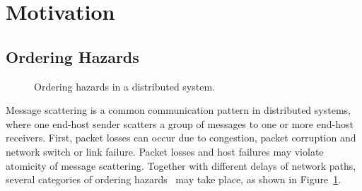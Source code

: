 \section{Motivation}
\label{sec:motivation}

\subsection{Ordering Hazards}
\label{subsec:tso}


\begin{figure}[t]
\centering
    \hspace{0.05\textwidth}
    \hspace{0.05\textwidth}
	\caption{Ordering hazards in a distributed system.}
	\label{fig:ordering}
	\vspace{-1.5em}
\end{figure}


Message scattering is a common communication pattern in distributed systems, where one end-host sender scatters a group of messages to one or more end-host receivers.
First, packet losses can occur due to congestion, packet corruption and network switch or link failure.
Packet losses and host failures may violate atomicity of message scattering.
Together with different delays of network paths, several categories of ordering hazards~\cite{gharachorloo1990memory,sewell2010x86} may take place, as shown in Figure~\ref{fig:ordering}.

